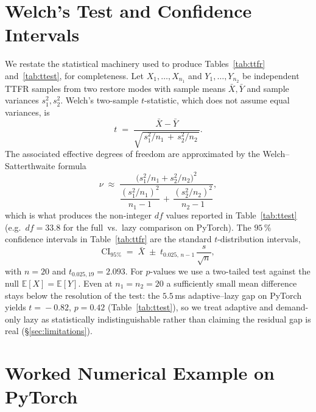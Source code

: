 \documentclass[journal]{IEEEtran}
\begin{document}
\section{Welch's Test and Confidence Intervals}
\label{app:stats}

We restate the statistical machinery used to produce Tables~\ref{tab:ttfr}
and~\ref{tab:ttest}, for completeness. Let $X_1,\dots,X_{n_1}$ and
$Y_1,\dots,Y_{n_2}$ be independent TTFR samples from two restore modes
with sample means $\bar{X},\bar{Y}$ and sample variances $s_1^2,s_2^2$.
Welch's two-sample $t$-statistic, which does not assume equal variances,
is
\begin{equation}
  t \;=\;
  \frac{\bar{X} - \bar{Y}}
       {\sqrt{\,s_1^2/n_1 \,+\, s_2^2/n_2\,}}.
  \label{eq:welch-t}
\end{equation}
The associated effective degrees of freedom are approximated by the
Welch--Satterthwaite formula
\begin{equation}
  \nu \;\approx\;
  \frac{\bigl(s_1^2/n_1 + s_2^2/n_2\bigr)^{2}}
       {\dfrac{(s_1^2/n_1)^{2}}{n_1-1} \,+\, \dfrac{(s_2^2/n_2)^{2}}{n_2-1}},
  \label{eq:welch-df}
\end{equation}
which is what produces the non-integer $\textit{df}$ values reported in
Table~\ref{tab:ttest} (e.g.\ $\textit{df}\!=\!33.8$ for the
full~vs.~lazy comparison on PyTorch).
The $95\,\%$ confidence intervals in Table~\ref{tab:ttfr} are the standard
$t$-distribution intervals,
\begin{equation}
  \mathrm{CI}_{95\%} \;=\;
  \bar{X} \;\pm\; t_{0.025,\,n-1}\,\frac{s}{\sqrt{n}},
  \label{eq:ci}
\end{equation}
with $n\!=\!20$ and $t_{0.025,19}\!=\!2.093$. For $p$-values we use a
two-tailed test against the null $\mathbb{E}[X]\!=\!\mathbb{E}[Y]$. Even at
$n_1\!=\!n_2\!=\!20$ a sufficiently small mean difference stays below the
resolution of the test: the $5.5$\,ms adaptive--lazy gap on PyTorch yields
$t\!=\!-0.82$, $p\!=\!0.42$ (Table~\ref{tab:ttest}), so we treat adaptive
and demand-only lazy as statistically indistinguishable rather than claiming
the residual gap is real (\S\ref{sec:limitations}).

\section{Worked Numerical Example on PyTorch}
\label{app:worked}
\end{document}
